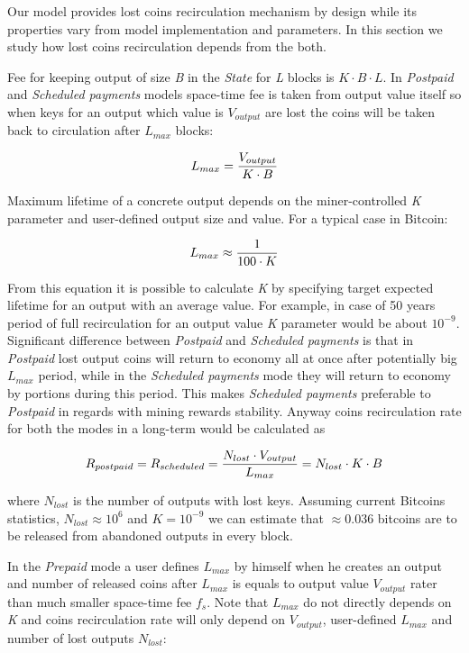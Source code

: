 \documentclass[]{llncs}   %
\newcommand{\state}{\textit{State}}
\begin{document}
Our model provides lost coins recirculation mechanism by design while its properties vary from model implementation and parameters. In this section we study how lost coins recirculation depends from the both.

Fee for keeping output of size \textit{B} in the \state{} for \textit{L} blocks is ${K \cdot B \cdot L}$. In \textit{Postpaid} and \textit{Scheduled payments} models space-time fee is taken from output value itself so when keys for an output which value is \textit{$V_{output}$} are lost the coins will be taken back to circulation after \textit{$L_{max}$} blocks: 

\begin{equation}
{L_{max} = {V_{output} \over K \cdot B}}
\end{equation}

Maximum lifetime of a concrete output depends on the miner-controlled \textit{K} parameter and user-defined output size and value. For a typical case in Bitcoin:

\begin{equation}
{L_{max} \approx {1 \over 100 \cdot K}}
\end{equation}

From this equation it is possible to calculate \textit{K} by specifying target expected lifetime for an output with an average value. For example, in case of 50 years period of full recirculation for an output value \textit{K} parameter would be about $10^{-9}$. Significant difference between \textit{Postpaid} and \textit{Scheduled payments} is that in \textit{Postpaid} lost output coins will return to economy all at once after potentially big $L_{max}$ period, while in the \textit{Scheduled payments} mode they will return to economy by portions during this period. This makes \textit{Scheduled payments} preferable to \textit{Postpaid} in regards with mining rewards stability. Anyway coins recirculation rate for both the modes in a long-term would be calculated as

\begin{equation}
R_{postpaid} = R_{scheduled} = {N_{lost} \cdot V_{output} \over L_{max}} = {N_{lost} \cdot K \cdot B}
\end{equation}

where $N_{lost}$ is the number of outputs with lost keys. Assuming current Bitcoins statistics, $N_{lost}\approx10^6$ and $K = 10^{-9}$ we can estimate that $\approx0.036$ bitcoins are to be released from abandoned outputs in every block.

In the \textit{Prepaid} mode a user defines $L_{max}$ by himself when he creates an output and number of released coins after $L_{max}$ is equals to output value $V_{output}$ rater than much smaller space-time fee $f_s$. Note that $L_{max}$ do not directly depends on \textit{K} and coins recirculation rate will only depend on $V_{output}$, user-defined $L_{max}$ and number of lost outputs $N_{lost}$:
\end{document}
